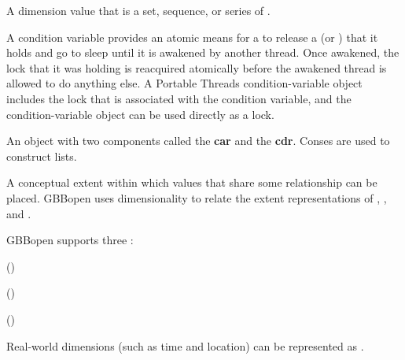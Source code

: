 \begin{glossary-list}

% 
%
A dimension value that is a set, sequence, or series of
.


%
%
% 
%
A condition variable provides an atomic means for a  to release
a  (or ) that it holds and go to sleep until
it is awakened by another thread.  Once awakened, the lock that it was holding
is reacquired atomically before the awakened thread is allowed to do anything
else.  A Portable Threads condition-variable object includes the lock that is
associated with the condition variable, and the condition-variable object can
be used directly as a lock.


\glent[cons]
%
%
%
%
%
%
%
An object with two components called the \textbf{car} and the \textbf{cdr}.
Conses are used to construct lists.


\glent[dimension] 
%
%
A conceptual extent within which values that share some
relationship can be placed.  GBBopen uses dimensionality to relate the
extent representations of ,
, and .

GBBopen supports three :
\begin{tightenumerate}
\item {} ()
\item {} ()
\item {} ()
\end{tightenumerate}

Real-world dimensions (such as time and location) can be represented as
.



\end{glossary-list}
